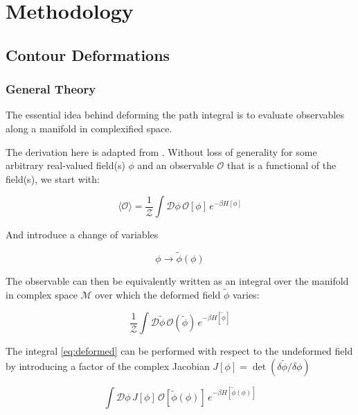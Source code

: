 \documentclass[12pt]{article}
\begin{document}
\section{Methodology}

\subsection{Contour Deformations}

\subsubsection{General Theory}

The essential idea behind deforming the path integral is to evaluate observables along a manifold in complexified space. 

The derivation here is adapted from \cite{Detmold_2021}. Without loss of generality
for some arbitrary real-valued field(s) $\phi$ and an observable $\mathcal{O}$ that is a functional of the field(s), we start with:

\begin{equation} \label{eq:undeformed}
	\langle \mathcal{O} \rangle = \frac{1}{\mathcal{Z}} \int \mathcal{D}\phi \, \mathcal{O}[\phi] \, e^{-\beta H[\phi]}
\end{equation}

And introduce a change of variables 

\begin{equation*}
	\phi \rightarrow \tilde{\phi}(\phi)
\end{equation*}

The observable can then be equivalently written as an integral over the manifold in complex space $\mathcal{M}$ 
over which the deformed field $\tilde{\phi}$ varies:

\begin{equation} \label{eq:deformed}
	\frac{1}{\mathcal{Z}} \int \mathcal{D}\tilde{\phi} \, \mathcal{O}(\tilde{\phi}) \, e^{-\beta H[\tilde{\phi}]}
\end{equation}

The integral \ref{eq:deformed} can be performed with respect to the undeformed field by introducing a factor of the complex 
Jacobian $J[\phi] = \det \left( \delta \tilde{\phi} / \delta \phi \right)$

\begin{equation*}
	\int \mathcal{D}\phi \, J[\phi] \, \mathcal{O}[\tilde{\phi}(\phi)] \, e^{-\beta H[\tilde{\phi}(\phi)]}
\end{equation*}
\end{document}
